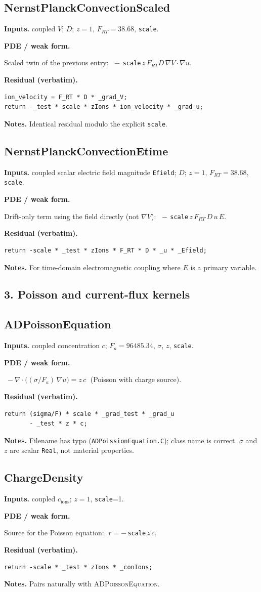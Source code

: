 \documentclass[11pt]{article}
\newcommand{\F}{F_{\!a}}            %
\newenvironment{ecmEntry}[1]{%
  \subsection{#1}%
}{}
\newcommand{\inputsRow}[1]{\par\noindent\textbf{Inputs.} #1\par}
\newcommand{\pdeRow}[1]{\par\noindent\textbf{PDE / weak form.}\par #1\par}
\newcommand{\codeRow}{\par\noindent\textbf{Residual (verbatim).}\par}
\newcommand{\notesRow}[1]{\par\noindent\textbf{Notes.} #1\par}
\begin{document}
\begin{ecmEntry}{NernstPlanckConvectionScaled}
\inputsRow{coupled $V$; $D$; $z=1,\,F_{RT}=38.68,\,$\texttt{scale}.}
\pdeRow{Scaled twin of the previous entry: $\;-\,$\texttt{scale}$\,z\,F_{RT}D\,\nabla V\cdot\nabla u$.}
\codeRow\begin{lstlisting}
ion_velocity = F_RT * D * _grad_V;
return -_test * scale * zIons * ion_velocity * _grad_u;
\end{lstlisting}
\notesRow{Identical residual modulo the explicit \texttt{scale}.}
\end{ecmEntry}

\begin{ecmEntry}{NernstPlanckConvectionEtime}
\inputsRow{coupled scalar electric field magnitude \texttt{Efield}; $D$; $z=1,\,F_{RT}=38.68,\,$\texttt{scale}.}
\pdeRow{Drift-only term using the field directly (not $\nabla V$):
$\;-\,$\texttt{scale}$\,z\,F_{RT}\,D\,u\,E$.}
\codeRow\begin{lstlisting}
return -scale * _test * zIons * F_RT * D * _u * _Efield;
\end{lstlisting}
\notesRow{For time-domain electromagnetic coupling where $E$ is a primary variable.}
\end{ecmEntry}

\subsection*{3. Poisson and current-flux kernels}

\begin{ecmEntry}{ADPoissonEquation}
\inputsRow{coupled concentration $c$; $\F=96485.34$, $\sigma$, $z$, \texttt{scale}.}
\pdeRow{$\;-\nabla\cdot\!\bigl((\sigma/\F)\,\nabla u\bigr) = z\,c\;$ (Poisson with charge source).}
\codeRow\begin{lstlisting}
return (sigma/F) * scale * _grad_test * _grad_u
       - _test * z * c;
\end{lstlisting}
\notesRow{Filename has typo (\texttt{ADPoissionEquation.C}); class name is correct.
$\sigma$ and $z$ are scalar \texttt{Real}, not material properties.}
\end{ecmEntry}

\begin{ecmEntry}{ChargeDensity}
\inputsRow{coupled $c_{\text{ions}}$; $z=1,\,$\texttt{scale}=1.}
\pdeRow{Source for the Poisson equation: $\;r=-\,$\texttt{scale}$\,z\,c$.}
\codeRow\begin{lstlisting}
return -scale * _test * zIons * _conIons;
\end{lstlisting}
\notesRow{Pairs naturally with \textsc{ADPoissonEquation}.}
\end{ecmEntry}
\end{document}
